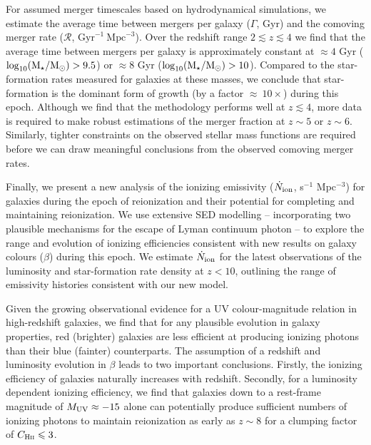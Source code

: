 For assumed merger timescales based on hydrodynamical simulations, we estimate the average time between mergers per galaxy ($\Gamma$, Gyr) and the comoving merger rate ($\mathcal{R}$, $\text{Gyr}^{-1}~\text{Mpc}^{-3}$). Over the redshift range $2 \lesssim z \lesssim 4$ we find that the average time between mergers per galaxy is approximately constant at $\approx 4$ Gyr ($\log_{10}(\Mstar/\text{M}_{\odot}) > 9.5$) or $\approx 8$ Gyr ($\log_{10}(\Mstar/\text{M}_{\odot}) > 10$). Compared to the star-formation rates measured for galaxies at these masses, we conclude that star-formation is the dominant form of growth (by a factor $\approx ~10\times$) during this epoch. Although we find that the methodology performs well at $z\lesssim 4$, more data is required to make robust estimations of the merger fraction at $z\sim5$ or $z\sim6$. Similarly, tighter constraints on the observed stellar mass functions are required before we can draw meaningful conclusions from the observed comoving merger rates.

Finally, we present a new analysis of the ionizing emissivity ($\dot{N}_{\rm{ion}}$, s$^{-1}$ Mpc$^{-3}$) for galaxies during the epoch of reionization and their potential for completing and maintaining reionization. We use extensive SED modelling -- incorporating two plausible mechanisms for the escape of Lyman continuum photon -- to explore the range and evolution of ionizing efficiencies consistent with new results on galaxy colours ($\beta$) during this epoch. We estimate $\dot{N}_{\rm{ion}}$ for the latest observations of the luminosity and star-formation rate density at $z<10$, outlining the range of emissivity histories consistent with our new model. 

Given the growing observational evidence for a UV colour-magnitude relation in high-redshift galaxies, we find that for any plausible evolution in galaxy properties, red (brighter) galaxies are less efficient at producing ionizing photons than their blue (fainter) counterparts. The assumption of a redshift and luminosity evolution in $\beta$ leads to two important conclusions. Firstly, the ionizing efficiency of galaxies naturally increases with redshift.
Secondly, for a luminosity dependent ionizing efficiency, we find that galaxies down to a rest-frame magnitude of $M_{\rm{UV}} \approx -15$ alone can potentially produce sufficient numbers of ionizing photons to maintain reionization as early as $z\sim8$ for a clumping factor of $C_{\textsc{Hii}} \leq 3$.





\clearpage




